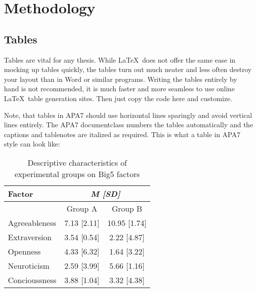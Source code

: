 \section{Methodology}
\subsection{Tables}
Tables are vital for any thesis. While \LaTeX\ does not offer the same ease in mocking up tables quickly, the tables turn out much neater and less often destroy your layout than in Word or similar programs. Writing the tables entirely by hand is not recommended, it is much faster and more seamless to use online \LaTeX\ table generation sites. Then just copy the code here and customize.  

Note, that tables in APA7 should use horizontal lines sparingly and avoid vertical lines entirely. The APA7 documentclass numbers the tables automatically and the captions and tablenotes are italized as required. This is what a table in APA7 style can look like:

\begin{table}[h]
    \caption{Descriptive characteristics of experimental groups on Big5 factors}
\label{big5}
    \begin{tabular}{lcc}
    \hline
     \textbf{Factor}& \multicolumn{2}{c}{\textit{\textbf{M {[}SD{]}}}} \\ \hline
     & Group A & Group B \\
    Agreeableness & 7.13 {[}2.11{]} & 10.95 {[}1.74{]} \\
    Extraversion & 3.54 {[}0.54{]} & 2.22 {[}4.87{]} \\
    Openness & 4.33 {[}6.32{]} & 1.64 {[}3.22{]} \\
    Neuroticism & 2.59 {[}3.99{]} & 5.66 {[}1.16{]} \\
    Concioussness & 3.88 {[}1.04{]} & 3.32 {[}4.38{]} \\ \hline
    \end{tabular}
    \end{table}